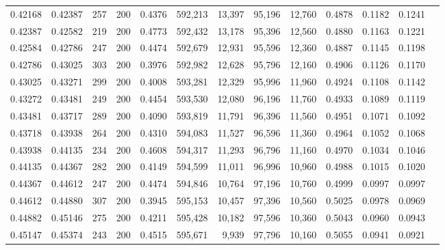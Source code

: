 \begin{tabular}{rrrrrrrrrrrrr}
0.42168 & 0.42387 &   257 & 200 &                                     0.4376 & 592,213 &  13,397 &  95,196 &  12,760 & 0.4878 & 0.1182 & 0.1241 \\
0.42387 & 0.42582 &   219 & 200 &                                     0.4773 & 592,432 &  13,178 &  95,396 &  12,560 & 0.4880 & 0.1163 & 0.1221 \\
0.42584 & 0.42786 &   247 & 200 &                                     0.4474 & 592,679 &  12,931 &  95,596 &  12,360 & 0.4887 & 0.1145 & 0.1198 \\
0.42786 & 0.43025 &   303 & 200 &                                     0.3976 & 592,982 &  12,628 &  95,796 &  12,160 & 0.4906 & 0.1126 & 0.1170 \\
0.43025 & 0.43271 &   299 & 200 &                                     0.4008 & 593,281 &  12,329 &  95,996 &  11,960 & 0.4924 & 0.1108 & 0.1142 \\
0.43272 & 0.43481 &   249 & 200 &                                     0.4454 & 593,530 &  12,080 &  96,196 &  11,760 & 0.4933 & 0.1089 & 0.1119 \\
0.43481 & 0.43717 &   289 & 200 &                                     0.4090 & 593,819 &  11,791 &  96,396 &  11,560 & 0.4951 & 0.1071 & 0.1092 \\
0.43718 & 0.43938 &   264 & 200 &                                     0.4310 & 594,083 &  11,527 &  96,596 &  11,360 & 0.4964 & 0.1052 & 0.1068 \\
0.43938 & 0.44135 &   234 & 200 &                                     0.4608 & 594,317 &  11,293 &  96,796 &  11,160 & 0.4970 & 0.1034 & 0.1046 \\
0.44135 & 0.44367 &   282 & 200 &                                     0.4149 & 594,599 &  11,011 &  96,996 &  10,960 & 0.4988 & 0.1015 & 0.1020 \\
0.44367 & 0.44612 &   247 & 200 &                                     0.4474 & 594,846 &  10,764 &  97,196 &  10,760 & 0.4999 & 0.0997 & 0.0997 \\
0.44612 & 0.44880 &   307 & 200 &                                     0.3945 & 595,153 &  10,457 &  97,396 &  10,560 & 0.5025 & 0.0978 & 0.0969 \\
0.44882 & 0.45146 &   275 & 200 &                                     0.4211 & 595,428 &  10,182 &  97,596 &  10,360 & 0.5043 & 0.0960 & 0.0943 \\
0.45147 & 0.45374 &   243 & 200 &                                     0.4515 & 595,671 &   9,939 &  97,796 &  10,160 & 0.5055 & 0.0941 & 0.0921 \\

\end{tabular}
